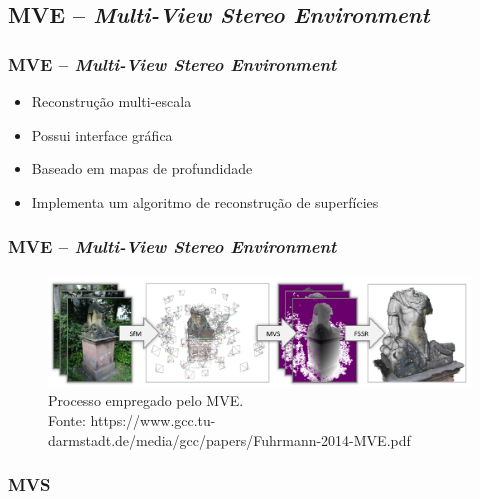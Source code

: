 \documentclass[table, usenames, svgnames, xcolor=dvipsnames]{beamer}
\begin{document}
\subsection{MVE -- \protect\emph{Multi-View Stereo Environment}}

\begin{frame} 
\frametitle{\textbf{MVE -- \emph{Multi-View Stereo Environment}}}
	\begin{center}
		\begin{itemize}
		\item {Reconstrução multi-escala}
		\item {Possui interface gráfica}
		\item {Baseado em mapas de profundidade}
		\item {Implementa um algoritmo de reconstrução de superfícies}
		\end{itemize}
	\end{center}
\end{frame}

\begin{frame}
\frametitle{\textbf{MVE -- \protect\emph{Multi-View Stereo Environment}}}
	\begin{center}
	\begin{figure}
		\centering
		\includegraphics[width=1\linewidth]{figs/mvepipe.png}
	 	\caption{
		Processo empregado pelo MVE. \\
		\tiny{Fonte: https://www.gcc.tu-darmstadt.de/media/gcc/papers/Fuhrmann-2014-MVE.pdf}
	}
	\end{figure}
	\end{center}
\end{frame}

\subsubsection{MVS}
\end{document}
